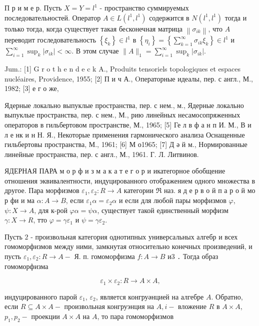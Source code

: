 \documentclass[10pt]{article}
\begin{document}
П р и м е р. Пусть $X=Y=l^{1}$ - пространство суммируемых последовательностей. Оператор $A \in L\left(l^{1}, l^{1}\right)$ содержится в $N\left(l^{1}, l^{1}\right)$ тогда и только тогда, когда существует такая бесконечная матрица $\left\|\sigma_{i k}\right\|$, что $A$ переводит госледовательность $\left\{\xi_{k}\right\} \in l^{1}$ в $\left\{\eta_{i}\right\}=\left\{\sum_{k=1}^{\infty} \sigma_{i k} \xi_{k}\right\} \in l^{1}$ и $\sum_{i=1}^{\infty} \sup _{k}\left|\sigma_{i k}\right|<\infty$. В этом случае $\|A\|_{1}=\sum_{i=1}^{\infty} \sup _{k}\left|\sigma_{i k}\right|$.



Jum.: [1] G r o t h e n d e c k A., Produits tensoriels topologiques et espaces nucléaires, Providence, 1955; [2] П и ч А., Oператорные идеалы, пер. с англ., М., 1982; [3] е г о же,

Ядерные локально выпуклые пространства, пер. с нем., м., Ядерные локально выпуклые пространства, пер. с нем., М., рию линейных несамосопряженных операторов в гильбертовом пространстве, М., 1965; [5] Ге л в ф а н п И. М., В и л е нк и н Н. Я., Некоторые применения гармонического анализа Оснащенные гильбертовы пространства, М., 1961; [6] М о1965; [7] Д ә й м., Нормированные линейные пространства, пер. с англ., М., 1961. Г. Л. Литвинов.



ЯДЕРНАЯ ПАРА м о р ф и з м а к а т е г о р и икатегорное обобщение отношения эквивалентности, индуцированного отображением одного множества в другое. Пара морфизмов $\varepsilon_{1}, \varepsilon_{2}: R \rightarrow A$ категории $\mathfrak{R}$ наз. я д е р в о й п а р о й мо р фи и ма $\alpha: A \rightarrow B$, если $\varepsilon_{1} \alpha=\varepsilon_{2} \alpha$ и если для любой пары морфизмов $\varphi$, $\psi: X \rightarrow A$, для к-рой $\varphi \alpha=\psi \alpha$, существует такой единственный морфизм $\gamma: X \rightarrow R$, тто $\varphi=\gamma \varepsilon_{1}$ и $\psi=\gamma \varepsilon_{2}$.



Пусть $\mathfrak{2}$ - произвольная категория однотипных универсальных алгебр и всех гомоморфизмов между ними, замкнутая относительно конечных произведений, и пусть $\varepsilon_{1}, \varepsilon_{2}: R \rightarrow A-$ Я. п. гомоморфизма $f: A \rightarrow B$ и3 ․ Тогда образ гомоморфизма



\[

\varepsilon_{1} \times \varepsilon_{2}: R \rightarrow A \times A,

\]



индуцированного парой $\varepsilon_{1}$, $\varepsilon_{2}$, является конгруәнцией на алгебре $A$. Обратно, если $R \subseteq A \times A-$ произвольная конгруэнция на $A, i-$ вложение $R$ в $A \times A$, $p_{1}, p_{2}-$ проекции $A \times A$ на $A$, то пара гомоморфизмов
\end{document}
